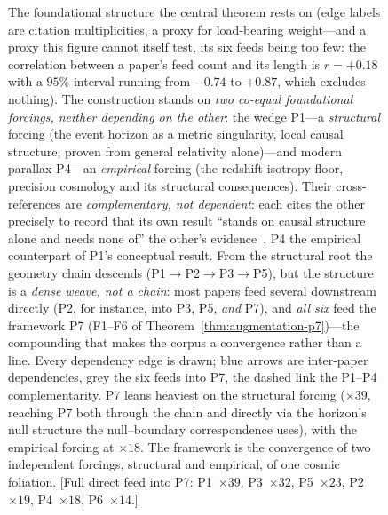 \documentclass[11pt,a4paper]{article}
\theoremstyle{plain}
\theoremstyle{definition}
\theoremstyle{remark}
\begin{document}
\begin{figure}[htbp]
\caption{The foundational structure the central theorem rests on (edge labels are citation multiplicities, a proxy for load-bearing weight---and a proxy this figure cannot itself test, its six feeds being too few: the correlation between a paper's feed count and its length is $r=+0.18$ with a $95\%$ interval running from $-0.74$ to $+0.87$, which excludes nothing). The construction stands on \emph{two co-equal foundational forcings, neither depending on the other}: the wedge P1---a \emph{structural} forcing (the event horizon as a metric singularity, local causal structure, proven from general relativity alone)---and modern parallax P4---an \emph{empirical} forcing (the redshift-isotropy floor, precision cosmology and its structural consequences). Their cross-references are \emph{complementary, not dependent}: each cites the other precisely to record that its own result ``stands on causal structure alone and needs none of'' the other's evidence~\cite{JanzenBHcausality,JanzenModernParallax}, P4 the empirical counterpart of P1's conceptual result. From the structural root the geometry chain descends (P1$\to$P2$\to$P3$\to$P5), but the structure is a \emph{dense weave, not a chain}: most papers feed several downstream directly (P2, for instance, into P3, P5, \emph{and} P7), and \emph{all six} feed the framework P7 (F1--F6 of Theorem~\ref{thm:augmentation-p7})---the compounding that makes the corpus a convergence rather than a line. Every dependency edge is drawn; blue arrows are inter-paper dependencies, grey the six feeds into P7, the dashed link the P1--P4 complementarity. P7 leans heaviest on the structural forcing (${\times}39$, reaching P7 both through the chain and directly via the horizon's null structure the null--boundary correspondence uses), with the empirical forcing at ${\times}18$. The framework is the convergence of two independent forcings, structural and empirical, of one cosmic foliation. [Full direct feed into P7: P1~${\times}39$, P3~${\times}32$, P5~${\times}23$, P2~${\times}19$, P4~${\times}18$, P6~${\times}14$.]}
\label{fig:dependency-structure}
\end{figure}
\end{document}
